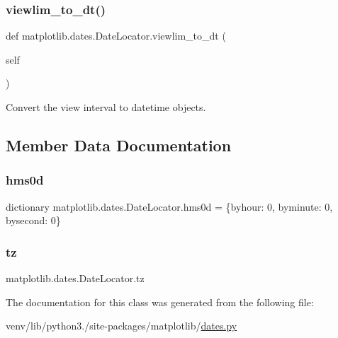 \subsubsection{\texorpdfstring{viewlim\+\_\+to\+\_\+dt()}{viewlim\_to\_dt()}}
{\footnotesize\ttfamily def matplotlib.\+dates.\+Date\+Locator.\+viewlim\+\_\+to\+\_\+dt (\begin{DoxyParamCaption}\item[{}]{self }\end{DoxyParamCaption})}

\begin{DoxyVerb}Convert the view interval to datetime objects.\end{DoxyVerb}
 

\subsection{Member Data Documentation}
\mbox{\label{classmatplotlib_1_1dates_1_1DateLocator_aae3348d2157eff75831c70b43dd60134}} 
\subsubsection{\texorpdfstring{hms0d}{hms0d}}
{\footnotesize\ttfamily dictionary matplotlib.\+dates.\+Date\+Locator.\+hms0d = \{\textquotesingle{}byhour\textquotesingle{}\+: 0, \textquotesingle{}byminute\textquotesingle{}\+: 0, \textquotesingle{}bysecond\textquotesingle{}\+: 0\}\hspace{0.3cm}{\ttfamily [static]}}

\mbox{\label{classmatplotlib_1_1dates_1_1DateLocator_aa18faf34dbf00ed4820535b64cd7194e}} 
\subsubsection{\texorpdfstring{tz}{tz}}
{\footnotesize\ttfamily matplotlib.\+dates.\+Date\+Locator.\+tz}



The documentation for this class was generated from the following file\+:\begin{DoxyCompactItemize}
\item 
venv/lib/python3./site-\/packages/matplotlib/\hyperlink{dates_8py}{dates.\+py}\end{DoxyCompactItemize}
